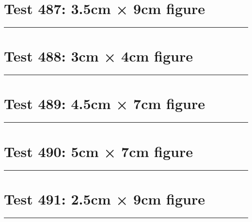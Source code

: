 \documentclass[a4paper,11pt]{article}
\begin{document}
\section*{Test 487: 3.5cm × 9cm figure}
\begin{swarmwrap}%
  \begin{minipage}[t]{3cm}
    \centering
    \rule{\linewidth}{9cm}
  \end{minipage}%
\end{swarmwrap}%
\swarmwrapnext
\lipsum[54]
\lipsum[55]
\lipsum[56]
\lipsum[57]
\lipsum[58]
\lipsum[59]
\section*{Test 488: 3cm × 4cm figure}
\begin{swarmwrap}%
  \begin{minipage}[t]{3cm}
    \centering
    \rule{\linewidth}{4cm}
  \end{minipage}%
\end{swarmwrap}%
\swarmwrapnext
\lipsum[83]
\lipsum[84]
\lipsum[85]
\lipsum[86]
\lipsum[87]
\section*{Test 489: 4.5cm × 7cm figure}
\begin{swarmwrap}%
  \begin{minipage}[t]{4cm}
    \centering
    \rule{\linewidth}{7cm}
  \end{minipage}%
\end{swarmwrap}%
\swarmwrapnext
\lipsum[35]
\lipsum[36]
\lipsum[37]
\lipsum[38]
\lipsum[39]
\lipsum[40]
\section*{Test 490: 5cm × 7cm figure}
\begin{swarmwrap}%
  \begin{minipage}[t]{5cm}
    \centering
    \rule{\linewidth}{7cm}
  \end{minipage}%
\end{swarmwrap}%
\swarmwrapnext
\lipsum[83]
\lipsum[84]
\lipsum[85]
\section*{Test 491: 2.5cm × 9cm figure}
\begin{swarmwrap}%
  \begin{minipage}[t]{2cm}
    \centering
    \rule{\linewidth}{9cm}
  \end{minipage}%
\end{swarmwrap}%
\swarmwrapnext
\lipsum[70]
\lipsum[71]
\lipsum[72]
\end{document}
